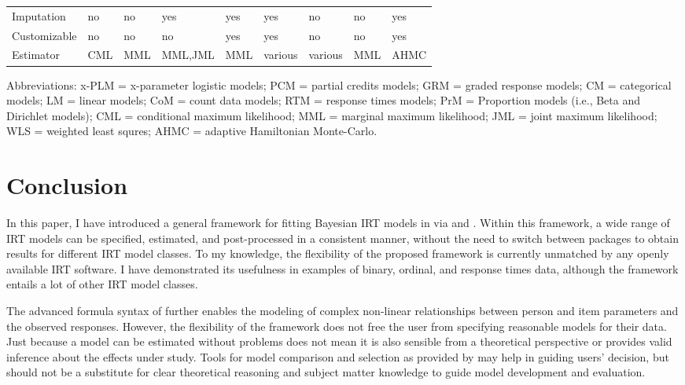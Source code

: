 \documentclass[jss]{jss}
\begin{document}
\begin{CodeChunk}
\begin{table}[t]
\begin{threeparttable}
\begin{tabular}{lllllllll}
Imputation & no & no & yes & yes & yes & no & no & yes\\
Customizable & no & no & no & yes & yes & no & no & yes\\
Estimator & CML & MML & MML,JML & MML & various & various & MML & AHMC\\
\bottomrule
\end{tabular}
\begin{tablenotes}
\item Abbreviations: x-PLM = x-parameter logistic models; PCM = partial credits models; GRM = graded response models; CM = categorical models; LM = linear models; CoM = count data models; RTM = response times models; PrM =  Proportion models (i.e., Beta and Dirichlet models); CML = conditional maximum likelihood; MML = marginal maximum likelihood; JML = joint maximum likelihood; WLS = weighted least squres; AHMC = adaptive Hamiltonian Monte-Carlo.
\end{tablenotes}
\end{threeparttable}
\end{table}

\end{CodeChunk}

\hypertarget{conclusion}{%
\section{Conclusion}\label{conclusion}}

In this paper, I have introduced a general framework for fitting
Bayesian IRT models in  via  and .
Within this framework, a wide range of IRT models can be specified,
estimated, and post-processed in a consistent manner, without the need
to switch between packages to obtain results for different IRT model
classes. To my knowledge, the flexibility of the proposed framework is
currently unmatched by any openly available IRT software. I have
demonstrated its usefulness in examples of binary, ordinal, and response
times data, although the framework entails a lot of other IRT model
classes.

The advanced formula syntax of  further enables the modeling
of complex non-linear relationships between person and item parameters
and the observed responses. However, the flexibility of the framework
does not free the user from specifying reasonable models for their data.
Just because a model can be estimated without problems does not mean it
is also sensible from a theoretical perspective or provides valid
inference about the effects under study. Tools for model comparison and
selection as provided by  may help in guiding users' decision,
but should not be a substitute for clear theoretical reasoning and
subject matter knowledge to guide model development and evaluation.
\end{document}
